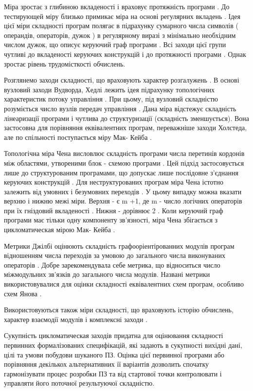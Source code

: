 Міра зростає з глибиною вкладеності і враховує протяжність програми . До тестирующей міру близько примикає міра на основі регулярних вкладень . Ідея цієї міри складності програм полягає в підрахунку сумарного числа символів ( операндів, операторів, дужок ) в регулярному виразі з мінімально необхідним числом дужок, що описує керуючий граф програми . Всі заходи цієї групи чутливі до вкладеності керуючих конструкцій і до протяжності програми . Однак зростає рівень трудомісткості обчислень.

Розглянемо заходи складності, що враховують характер розгалужень . В основі вузловий заходи Вудворда, Хедлі лежить ідея підрахунку топологічних характеристик потоку управління . При цьому, під вузловий складністю розуміється число вузлів передач управління . Дана міра відстежує складність лінеаризації програми і чутлива до структуризації (складність зменшується). Вона застосовна для порівняння еквівалентних програм, переважніше заходи Холстеда, але по спільності поступається міру Мак- Кейба .

Топологічна міра Чена висловлює складність програми числа перетинів кордонів між областями, утвореними блок - схемою програми . Цей підхід застосовується лише до структурованим програмами, що допускає лише послідовне з'єднання керуючих конструкцій . Для неструктурованих програм міра Чена істотно залежить від умовних і безумовних переходів . У цьому випадку можна вказати верхню і нижню межі міри. Верхня - є m +1, де m - число логічних операторів при їх гніздовий вкладеності . Нижня - дорівнює 2 . Коли керуючий граф програми має тільки одну компоненту зв'язності, міра Чена збігається з цикломатическая мірою Мак- Кейба .

Метрики Джілбі оцінюють складність графооріентірованних модулів програм відношенням числа переходів за умовою до загального числа виконуваних операторів . Добре зарекомендувала себе метрика, що відноситься число міжмодульних зв'язків до загального числа модулів. Названі метрики використовувалися для оцінки складності еквівалентних схем програм, особливо схем Янова .

Використовуються також міри складності, що враховують історію обчислень, характер взаємодії модулів і комплексні заходи .

Сукупність цикломатическая заходів придатна для оцінювання складності первинних формалізованих специфікацій, які задають в сукупності вихідні дані, цілі та умови побудови шуканого ПЗ. Оцінка цієї первинної програми або порівняння декількох альтернативних її варіантів дозволить спочатку гармонізувати процес розробки ПЗ та від стартової точки контролювати і управляти його поточної результуючої складністю.


